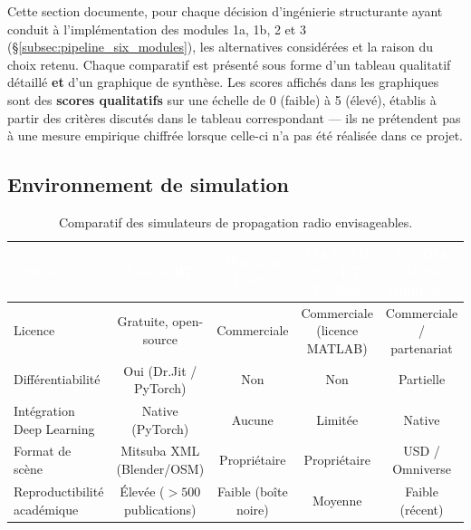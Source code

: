 \documentclass[12pt,a4paper,titlepage]{article}
\newcommand{\hd}[1]{\textcolor{white}{\textbf{#1}}}
\begin{document}
Cette section documente, pour chaque décision d'ingénierie structurante ayant conduit à l'implémentation des modules 1a, 1b, 2 et 3 (\S\ref{subsec:pipeline_six_modules}), les alternatives considérées et la raison du choix retenu. Chaque comparatif est présenté sous forme d'un tableau qualitatif détaillé \textbf{et} d'un graphique de synthèse. Les scores affichés dans les graphiques sont des \textbf{scores qualitatifs} sur une échelle de 0 (faible) à 5 (élevé), établis à partir des critères discutés dans le tableau correspondant --- ils ne prétendent pas à une mesure empirique chiffrée lorsque celle-ci n'a pas été réalisée dans ce projet.

\subsection{Environnement de simulation}
\label{subsec:choix_simulateur}

\begin{table}[H]
    \centering
    \caption{Comparatif des simulateurs de propagation radio envisageables.}
    \begin{tabularx}{\textwidth}{F{3.2cm}CCCC}
        \toprule
        \hd{Critère} & \hd{Sionna RT} & \hd{Wireless InSite} & \hd{MATLAB 5G/RT Toolbox} & \hd{NVIDIA Aerial Omniverse} \\
        \midrule
        Licence & Gratuite, open-source & Commerciale & Commerciale (licence MATLAB) & Commerciale / partenariat \\
        Différentiabilité & Oui (Dr.Jit / PyTorch) & Non & Non & Partielle \\
        Intégration Deep Learning & Native (PyTorch) & Aucune & Limitée & Native \\
        Format de scène & Mitsuba XML (Blender/OSM) & Propriétaire & Propriétaire & USD / Omniverse \\
        Reproductibilité académique & Élevée ($>500$ publications) & Faible (boîte noire) & Moyenne & Faible (récent) \\
        \bottomrule
    \end{tabularx}
\end{table}
\end{document}
